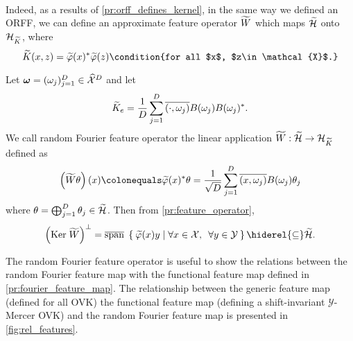 \paragraph{}
Indeed, as a results of \cref{pr:orff_defines_kernel}, in the same way we
defined an \acs{ORFF}, we can define an approximate feature operator
$\widetilde{W}$ which maps $\widetilde{\mathcal{H}}$ onto
$\mathcal{H}_{\widetilde{K}}$, where 
\begin{dmath*}
    \tildeK{\omega}(x,z)=
    \tildePhi{\omega}(x)^\adjoint\tildePhi{\omega}(z)\condition{for
    all $x$, $z\in\mathcal{X}$.}
\end{dmath*}
\begin{definition}
    Let $\boldsymbol{\mathbf{\omega}}=(\omega_j)_{j=1}^D\in\widehat{\mathcal{X}}^D$ and let
    \begin{dmath*}
        \tildeK{\omega}_e=\frac{1}{D}\sum_{j=1}^D
        \conj{\pairing{\cdot,\omega_j}}B(\omega_j)B(\omega_j)^*.
    \end{dmath*}
    We call random Fourier feature operator the linear application
    $\widetilde{W}:\widetilde{\mathcal{H}}\to \mathcal{H}_{\widetilde{K}}$ defined
    as
    \begin{dmath*}
        \left(\tildeW{\omega} \theta\right)(x)
        \colonequals \tildePhi{\omega}(x)^\adjoint \theta
        =\frac{1}{\sqrt{D}}\sum_{j=1}^D
        \conj{\pairing{x,\omega_j}}B(\omega_j)\theta_j
    \end{dmath*}
    where
    $\theta=\operatorname*{\bigoplus}_{j=1}^D\theta_j \in\widetilde{\mathcal{H}}$.
    Then from \cref{pr:feature_operator},
    \begin{dmath*}
        \left(\Ker \tildeW{\omega}\right)^\perp 
        = \lspan\Set{\tildePhi{\omega}(x)y | \forall x\in\mathcal{X},\enskip
        \forall y\in\mathcal{Y}} \hiderel{\subseteq} \tildeH{\omega}.
    \end{dmath*}
\end{definition}
The random Fourier feature operator is useful to show the relations between the
random Fourier feature map with the functional feature map defined in
\cref{pr:fourier_feature_map}. The relationship between the generic feature map
(defined for all \acl{OVK}) the functional feature map (defining a
shift-invariant $\mathcal{Y}$-Mercer \acl{OVK}) and the random Fourier feature
map is presented in \cref{fig:rel_features}.
